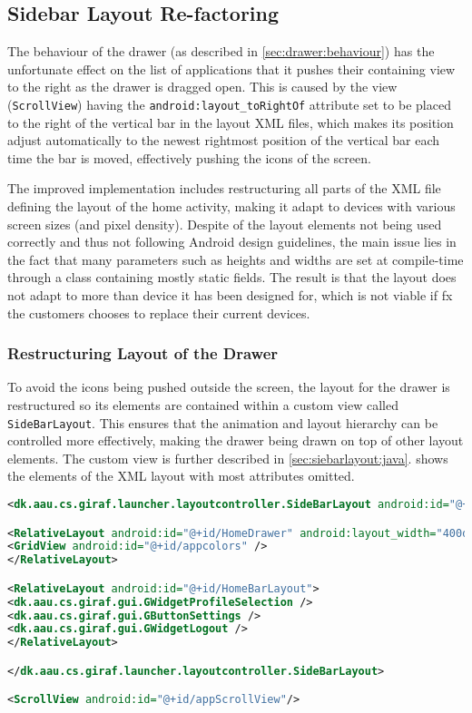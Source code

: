 \subsection{Sidebar Layout Re-factoring}
The behaviour of the drawer (as described in \cref{sec:drawer:behaviour}) has the unfortunate effect on the list of applications that it pushes their containing view to the right as the drawer is dragged open.
This is caused by the view (\lstinline|ScrollView|) having the  \lstinline{android:layout_toRightOf} attribute set to be placed to the right of the vertical bar in the layout XML files, which makes its position adjust automatically to the newest rightmost position of the vertical bar each time the bar is moved, effectively pushing the icons of the screen.

The improved implementation includes restructuring all parts of the XML file defining the layout of the home activity, making it adapt to devices with various screen sizes (and pixel density).
Despite of the layout elements not being used correctly and thus not following Android design guidelines, the main issue lies in the fact that many parameters such as heights and widths are set at compile-time through a class containing mostly static fields.
The result is that the layout does not adapt to more than device it has been designed for, which is not viable if fx the customers chooses to replace their current devices.

\subsubsection{Restructuring Layout of the Drawer}\label{sec:sidebarlayout:xml}
To avoid the icons being pushed outside the screen, the layout for the drawer is restructured so its elements are contained within a custom view called \lstinline|SideBarLayout|.
This ensures that the animation and layout hierarchy can be controlled more effectively, making the drawer being drawn on top of other layout elements.
The custom view is further described in \cref{sec:siebarlayout:java}.
 shows the elements of the XML layout with most attributes omitted.

\begin{lstlisting}[caption={Structure of the XML layout of the drawer.},label={lst:sidebarlayout}, language=XML]
<dk.aau.cs.giraf.launcher.layoutcontroller.SideBarLayout android:id="@+id/SideBarLayout" android:layout_marginLeft="-400dp">

<RelativeLayout android:id="@+id/HomeDrawer" android:layout_width="400dp">
<GridView android:id="@+id/appcolors" />
</RelativeLayout>

<RelativeLayout android:id="@+id/HomeBarLayout">
<dk.aau.cs.giraf.gui.GWidgetProfileSelection />
<dk.aau.cs.giraf.gui.GButtonSettings />
<dk.aau.cs.giraf.gui.GWidgetLogout />
</RelativeLayout>

</dk.aau.cs.giraf.launcher.layoutcontroller.SideBarLayout>

<ScrollView android:id="@+id/appScrollView"/>
\end{lstlisting}

